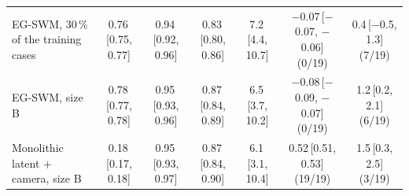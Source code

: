 \begin{tabular}{lcccccc}
EG-SWM, 30\,\% of the training cases & 0.76\,{\scriptsize[0.75, 0.77]} & 0.94\,{\scriptsize[0.92, 0.96]} & 0.83\,{\scriptsize[0.80, 0.86]} & 7.2\,{\scriptsize[4.4, 10.7]} & $-$0.07\,{\scriptsize[$-$0.07, $-$0.06]} (0/19) & 0.4\,{\scriptsize[$-$0.5, 1.3]} (7/19) \\
EG-SWM, size B & 0.78\,{\scriptsize[0.77, 0.78]} & 0.95\,{\scriptsize[0.93, 0.96]} & 0.87\,{\scriptsize[0.84, 0.89]} & 6.5\,{\scriptsize[3.7, 10.2]} & $-$0.08\,{\scriptsize[$-$0.09, $-$0.07]} (0/19) & 1.2\,{\scriptsize[0.2, 2.1]} (6/19) \\
Monolithic latent + camera, size B & 0.18\,{\scriptsize[0.17, 0.18]} & 0.95\,{\scriptsize[0.93, 0.97]} & 0.87\,{\scriptsize[0.84, 0.90]} & 6.1\,{\scriptsize[3.1, 10.4]} & 0.52\,{\scriptsize[0.51, 0.53]} (19/19) & 1.5\,{\scriptsize[0.3, 2.5]} (3/19) \\
\bottomrule
\end{tabular}
